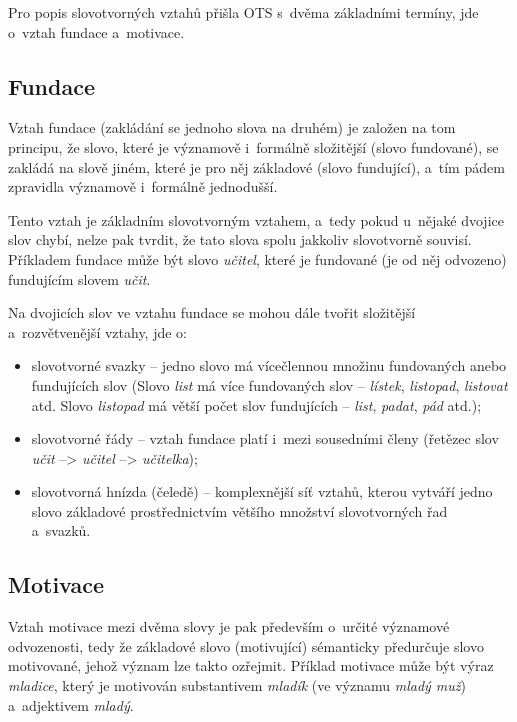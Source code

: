 Pro popis slovotvorných vztahů přišla OTS s~dvěma základními termíny,
jde o~vztah fundace a~motivace.

\hypertarget{fundace}{%
\subsection{Fundace}\label{fundace}}

Vztah fundace (zakládání se jednoho slova na druhém) je založen na tom
principu, že slovo, které je významově i~formálně složitější (slovo
fundované), se zakládá na slově jiném, které je pro něj základové (slovo
fundující), a~tím pádem zpravidla významově i~formálně jednodušší.
\parencite[95]{dokulil00}

Tento vztah je základním slovotvorným vztahem, a~tedy pokud u~nějaké
dvojice slov chybí, nelze pak tvrdit, že tato slova spolu jakkoliv
slovotvorně souvisí. Příkladem fundace může být slovo \emph{učitel},
které je fundované (je od něj odvozeno) fundujícím slovem \emph{učit}.

Na dvojicích slov ve vztahu fundace se mohou dále tvořit složitější
a~rozvětvenější vztahy, jde o:

\begin{itemize}
\tightlist
\item
  slovotvorné svazky -- jedno slovo má vícečlennou množinu fundovaných
  anebo fundujících slov (Slovo \emph{list} má více fundovaných slov --
  \emph{lístek}, \emph{listopad}, \emph{listovat} atd. Slovo
  \emph{listopad} má větší počet slov fundujících -- \emph{list},
  \emph{padat}, \emph{pád} atd.);
\item
  slovotvorné řády -- vztah fundace platí i~mezi sousedními členy
  (řetězec slov \emph{učit} --\textgreater{} \emph{učitel}
  --\textgreater{} \emph{učitelka});
\item
  slovotvorná hnízda (čeledě) -- komplexnější síť vztahů, kterou vytváří
  jedno slovo základové prostřednictvím většího množství slovotvorných
  řad a~svazků.~\parencite[12--13]{dokulil62}
\end{itemize}

\hypertarget{motivace}{%
\subsection{Motivace}\label{motivace}}

Vztah motivace mezi dvěma slovy je pak především o~určité významové
odvozenosti, tedy že základové slovo (motivující) sémanticky předurčuje
slovo motivované, jehož význam lze takto ozřejmit.
\parencite[96]{dokulil00} Příklad motivace může být výraz
\emph{mladice}, který je motivován substantivem \emph{mladík} (ve
významu \emph{mladý muž}) a~adjektivem \emph{mladý}.
\parencite[110]{dokulil62}

